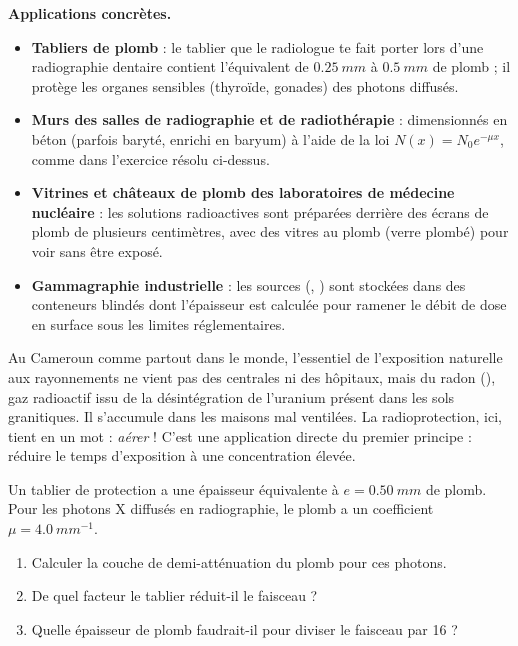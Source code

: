 \documentclass[11pt]{article}
\newcommand{\cle}[1]{{\popxbold\color{popdark}#1}}
\begin{document}
\textbf{Applications concrètes.}\par
\begin{itemize}
\item \textbf{Tabliers de plomb} : le tablier que le radiologue te fait porter lors d'une radiographie dentaire contient l'équivalent de $\SI{0,25}{mm}$ à $\SI{0,5}{mm}$ de plomb ; il protège les organes sensibles (thyroïde, gonades) des photons diffusés.
\item \textbf{Murs des salles de radiographie et de radiothérapie} : dimensionnés en béton (parfois baryté, enrichi en baryum) à l'aide de la loi $N(x) = N_{0}e^{-\mu x}$, comme dans l'exercice résolu ci-dessus.
\item \textbf{Vitrines et châteaux de plomb des laboratoires de médecine nucléaire} : les solutions radioactives sont préparées derrière des écrans de plomb de plusieurs centimètres, avec des vitres au plomb (verre plombé) pour voir sans être exposé.
\item \textbf{Gammagraphie industrielle} : les sources (, ) sont stockées dans des conteneurs blindés dont l'épaisseur est calculée pour ramener le débit de dose en surface sous les limites réglementaires.
\end{itemize}

\begin{savaistu}
Au Cameroun comme partout dans le monde, l'essentiel de l'exposition naturelle aux rayonnements ne vient pas des centrales ni des hôpitaux, mais du \cle{radon} (), gaz radioactif issu de la désintégration de l'uranium présent dans les sols granitiques. Il s'accumule dans les maisons mal ventilées. La radioprotection, ici, tient en un mot : \emph{aérer} ! C'est une application directe du premier principe : réduire le temps d'exposition à une concentration élevée.
\end{savaistu}

\begin{exercice}
Un tablier de protection a une épaisseur équivalente à $e = \SI{0,50}{mm}$ de plomb. Pour les photons X diffusés en radiographie, le plomb a un coefficient $\mu = \SI{4,0}{mm^{-1}}$.
\begin{enumerate}
\item Calculer la couche de demi-atténuation du plomb pour ces photons.
\item De quel facteur le tablier réduit-il le faisceau ?
\item Quelle épaisseur de plomb faudrait-il pour diviser le faisceau par 16 ?
\end{enumerate}
\end{exercice}
\end{document}
